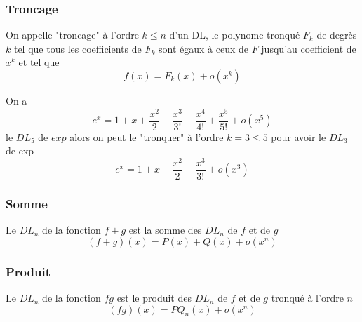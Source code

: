 \documentclass[11pt,colorlinks]{book}
\theoremstyle{mytheoremstyle}
\theoremstyle{mytheoremstyle}
\theoremstyle{mytheoremstyle}
\theoremstyle{mytheoremstyle}
\theoremstyle{mytheoremstyle}
\theoremstyle{mytheoremstyle}
\theoremstyle{mytheoremstyle}
\theoremstyle{mytheoremstyle}
\theoremstyle{myproblemstyle}
\begin{document}
  \subsubsection{Troncage}
  \begin{definition}
    On appelle "troncage" à l'ordre $k \leq n$ d'un DL, le polynome tronqué $F_k$ de degrès $k$ tel que 
    tous les coefficients de $F_k$ sont égaux à ceux de $F$ jusqu'au coefficient de $x^k$ et tel que 
    \begin{equation*}
      f(x) = F_k(x) + o(x^k)
    \end{equation*}
  \end{definition}
  \begin{ex}
    On a 
    \begin{equation*}
      e^x = 1 + x + \dfrac{x^2}{2} + \dfrac{x^3}{3!} + \dfrac{x^4}{4!} + \dfrac{x^5}{5!} + o(x^5)
    \end{equation*}
    le $DL_5$ de $exp$ alors on peut le "tronquer" à l'ordre $k=3\leq 5$ pour avoir le $DL_3$ de exp 
    \begin{equation*}
      e^x = 1 + x + \dfrac{x^2}{2} + \dfrac{x^3}{3!} + o(x^3)
    \end{equation*}
  \end{ex}
  \subsubsection{Somme}
  \begin{prop}
    Le $DL_n$ de la fonction $f+g$ est la somme des $DL_n$ de $f$ et de $g$ 
    \begin{equation*}
      (f+g)(x) = P(x)+Q(x) + o(x^n)
    \end{equation*}
  \end{prop}
  \subsubsection{Produit}
  \begin{prop}
    Le $DL_n$ de la fonction $fg$ est le produit des $DL_n$ de $f$ et de $g$ tronqué à l'ordre $n$ 
    \begin{equation*}
      (fg)(x) = PQ_{n}(x) + o(x^n)
    \end{equation*}
  \end{prop}
\end{document}
